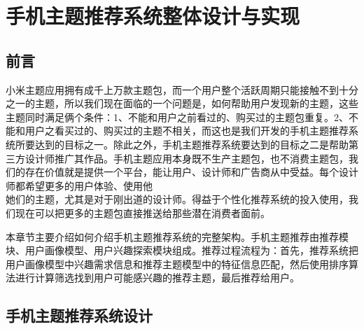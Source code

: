 
\chapter{手机主题推荐系统整体设计与实现}
    \section{前言}
    小米主题应用拥有成千上万款主题包，而一个用户整个活跃周期只能接触不到十分之一的主题，所以我们现在面临的一个问题是，如何帮助用户发现新的主题，这些主题同时满足俩个条件：1、不能和用户之前看过的、购买过的主题包重复。2、不能和用户之看买过的、购买过的主题不相关，而这也是我们开发的手机主题推荐系统所要达到的目标之一。除此之外，手机主题推荐系统要达到的目标之二是帮助第三方设计师推广其作品。手机主题应用本身既不生产主题包，也不消费主题包，我们的存在价值就是提供一个平台，能让用户、设计师和广告商从中受益。每个设计师都希望更多的用户体验、使用他\\她们的主题，尤其是对于刚出道的设计师。得益于个性化推荐系统的投入使用，我们现在可以把更多的主题包直接推送给那些潜在消费者面前。

    本章节主要介绍如何介绍手机主题推荐系统的完整架构。手机主题推荐由推荐模块、用户画像模型、用户兴趣探索模块组成。推荐过程流程为：首先，推荐系统把用户画像模型中兴趣需求信息和推荐主题模型中的特征信息匹配，然后使用排序算法进行计算筛选找到用户可能感兴趣的推荐主题，最后推荐给用户。
    \section{手机主题推荐系统设计}
    
    \begin{figure}
      \centering
        \label{pic:hl_recmd_structure2}
      \end{figure}

